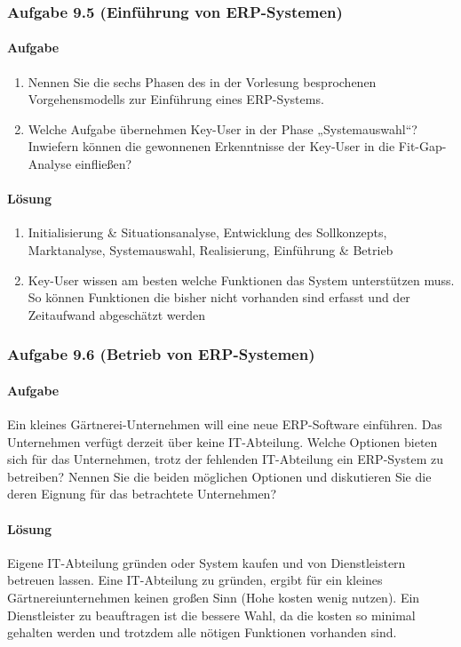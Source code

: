 \subsubsection*{Aufgabe 9.5 (Einführung von ERP-Systemen)}
    \paragraph*{Aufgabe}
        \begin{enumerate}[label=\alph*)]
            \item Nennen Sie die sechs Phasen des in der Vorlesung besprochenen Vorgehensmodells zur Einführung eines ERP-Systems.
            \item Welche Aufgabe übernehmen Key-User in der Phase „Systemauswahl“? Inwiefern können die gewonnenen Erkenntnisse der Key-User in die Fit-Gap-Analyse einfließen?
        \end{enumerate}
    \paragraph*{Lösung}
        \begin{enumerate}[label=\alph*)]
            \item Initialisierung \& Situationsanalyse, Entwicklung des Sollkonzepts, Marktanalyse, Systemauswahl, Realisierung, Einführung \& Betrieb
            \item Key-User wissen am besten welche Funktionen das System unterstützen muss. So können Funktionen die bisher nicht vorhanden sind erfasst und der Zeitaufwand abgeschätzt werden 
            
        \end{enumerate}

\subsubsection*{Aufgabe 9.6 (Betrieb von ERP-Systemen)}
    \paragraph*{Aufgabe}
        Ein kleines Gärtnerei-Unternehmen will eine neue ERP-Software einführen. Das Unternehmen verfügt derzeit über keine IT-Abteilung. Welche Optionen bieten sich für das Unternehmen, trotz der fehlenden IT-Abteilung ein ERP-System zu betreiben? Nennen Sie die beiden möglichen Optionen und diskutieren Sie die deren Eignung für das betrachtete Unternehmen?
    \paragraph*{Lösung}
        Eigene IT-Abteilung gründen oder System kaufen und von Dienstleistern betreuen lassen.
        Eine IT-Abteilung zu gründen, ergibt für ein kleines Gärtnereiunternehmen keinen großen Sinn (Hohe kosten wenig nutzen). Ein Dienstleister zu beauftragen ist die bessere Wahl, da die kosten so minimal gehalten werden und trotzdem alle nötigen Funktionen vorhanden sind.
    
        
